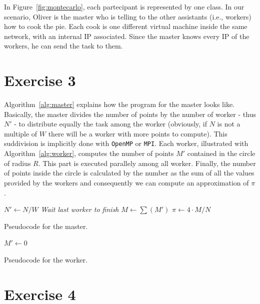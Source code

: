 \documentclass[a4paper]{article}
\begin{document}
In Figure~\ref{fig:montecarlo}, each partecipant is represented by one class. In our scenario, Oliver is the master who is telling to the other assistants (i.e., workers) how to cook the pie. Each cook is one different virtual machine inside the same network, with an internal IP associated. Since the master knows every IP of the workers, he can send the task to them.

\section{Exercise 3}

Algorithm~\ref{alg:master} explains how the program for the master looks like. Basically, the master divides the number of points by the number of worker - thus $N'$ - to distribute equally the task among the worker (obviously, if $N$ is not a multiple of $W$ there will be a worker with more points to compute). This suddivision is implicitly done with \texttt{OpenMP} or \texttt{MPI}. Each worker, illustrated with Algorithm~\ref{alg:worker}, computes the number of points $M'$ contained in the circle of radius $R$. This part is executed parallely among all worker. Finally, the number of points inside the circle is calculated by the number as the sum of all the values provided by the workers and consequently we can compute an approximation of $\pi$.

\begin{algorithm}[htbp]
{}
$N' \leftarrow N/W$\;
\textit{Wait last worker to finish}\;
$M \leftarrow \sum(M')$\;
$\pi \leftarrow 4 \cdot M/N$\;
\caption{Pseudocode for the master.}
\label{alg:master}
\end{algorithm}

\begin{algorithm}[htbp]
{}
$M' \leftarrow 0$\;
\caption{Pseudocode for the worker.}
\label{alg:worker}
\end{algorithm}

\section{Exercise 4}
\end{document}

